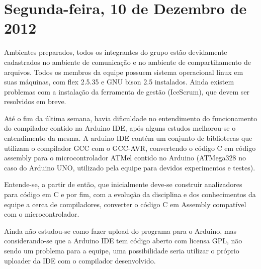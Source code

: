 \documentclass{abnt}
\begin{document}
    \section{Segunda-feira, 10 de Dezembro de 2012}
    Ambientes preparados, todos os integrantes do grupo estão devidamente cadastrados no ambiente de comunicação e no ambiente de compartihamento de arquivos.
    Todos os membros da equipe possuem sistema operacional linux em suas máquinas, com flex 2.5.35 e GNU bison 2.5 instalados. Ainda existem problemas com a instalação da ferramenta de gestão (IceScrum), que devem ser resolvidos em breve.

    Até o fim da última semana, havia dificuldade no entendimento do funcionamento do compilador contido na Arduino IDE, após alguns estudos melhorou-se o entendimento da mesma.
    A arduino IDE contém um conjunto de bibliotecas que utilizam o compilador GCC com o GCC-AVR, convertendo o código C em código assembly para o microcontrolador ATMel contido no Arduino (ATMega328 no caso do Arduino UNO, utilizado pela equipe para devidos experimentos e testes).

    Entende-se, a partir de então, que inicialmente deve-se construir analizadores para código em C e por fim, com a evolução da disciplina e dos conhecimentos da equipe a cerca de compiladores, converter o código C em Assembly compatível com o microcontrolador.

    Ainda não estudou-se como fazer upload do programa para o Arduino, mas considerando-se que a Arduino IDE tem código aberto com licensa GPL, não sendo um problema para a equipe, uma possibilidade seria utilizar o próprio uploader da IDE com o compilador desenvolvido.
\end{document}
